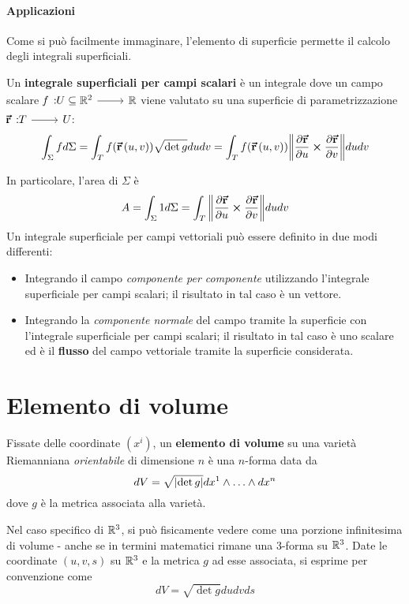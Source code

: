 \paragraph{Applicazioni}
Come si può facilmente immaginare, l'elemento di superficie permette il calcolo degli integrali superficiali.
\begin{define}
	Un \textbf{integrale superficiali per campi scalari} è un integrale dove un campo scalare $\funz[f]{U\subseteq\realset^2}{\realset}$ viene valutato su una superficie di parametrizzazione $\funz[\vba{r}]{T}{U}$:
	\begin{equation}
		\int_\Sigma fd\Sigma=\int_T f(\vb*{\va{r}}\left(u,v\right))\sqrt{\det g}dudv=\int_T f(\vb*{\va{r}}\left(u,v\right))\norm{\pdv{\vb*{\va{r}}}{u}\cross\pdv{\vb*{\va{r}}}{v}}dudv
	\end{equation}
\end{define}
In particolare, l'area di $\Sigma$ è
\begin{equation}
	A=\int_{\Sigma}1d\Sigma=\int_T\norm{\pdv{\vb*{\va{r}}}{u}\cross\pdv{\vb*{\va{r}}}{v}}dudv
\end{equation}
Un integrale superficiale per campi vettoriali può essere definito in due modi differenti:
\begin{itemize}
	\item Integrando il campo \textit{componente per componente} utilizzando l'integrale superficiale per campi scalari; il risultato in tal caso è un vettore.
	\item Integrando la \textit{componente normale} del campo tramite la superficie con l'integrale superficiale per campi scalari; il risultato in tal caso è uno scalare ed è il \textbf{flusso} del campo vettoriale tramite la superficie considerata.
\end{itemize}
\section{Elemento di volume}
\begin{define}
Fissate delle coordinate $\left(x^i\right)$, un \textbf{elemento di volume} su una varietà Riemanniana \textit{orientabile} di dimensione $n$ è una $n$-forma data da
\begin{equation}
	dV=\sqrt{\abs{\det g}}dx^1\wedge \ldots\wedge dx^n
\end{equation}
dove $g$ è la metrica associata alla varietà.
\end{define}
Nel caso specifico di $\mathbb{R}^3$, si può fisicamente vedere come una porzione infinitesima di volume - anche se in termini matematici rimane una 3-forma su $\mathbb{R}^3$. Date le coordinate $(u,v,s)$ su $\mathbb{R}^3$ e la metrica $g$ ad esse associata, si esprime per convenzione come
\begin{equation}
	dV=\sqrt{\det g}dudvds
\end{equation}
